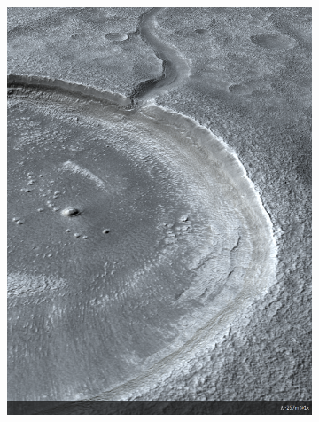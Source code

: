\begin{figure}[h]
\captionsetup[subfigure]{justification=centering}
\vspace{-2ex}
	\centering
    \setlength{\subfigureWidth}{0.50\textwidth}
    \setlength{\graphicsHeight}{70mm}
    \hypersetup{hidelinks=true}%
    \begin{subfigure}[t]{\subfigureWidth}
        \centering
        \includegraphics[height=\graphicsHeight]{sections/mars-solar-energy/mission-sites/images/ismenius-cavus-dtm.png}
        \label{fig:sub:ismenius-cavus-dtm}
    \end{subfigure}\hfill
    \begin{subfigure}[t]{\subfigureWidth}
        \centering

\end{subfigure}
\end{figure}
